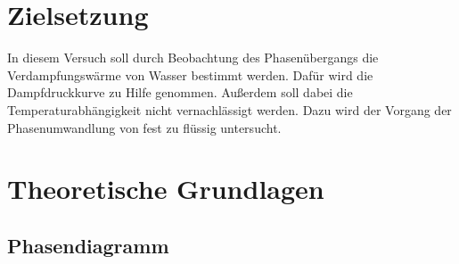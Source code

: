 \section{Zielsetzung}

In diesem Versuch soll durch Beobachtung des Phasenübergangs die 
Verdampfungswärme von Wasser bestimmt werden. Dafür wird die Dampfdruckkurve zu Hilfe genommen.
Außerdem soll dabei die Temperaturabhängigkeit nicht vernachlässigt werden.
Dazu wird der Vorgang der Phasenumwandlung von fest zu flüssig untersucht.
\section{Theoretische Grundlagen}

\subsection{Phasendiagramm}

